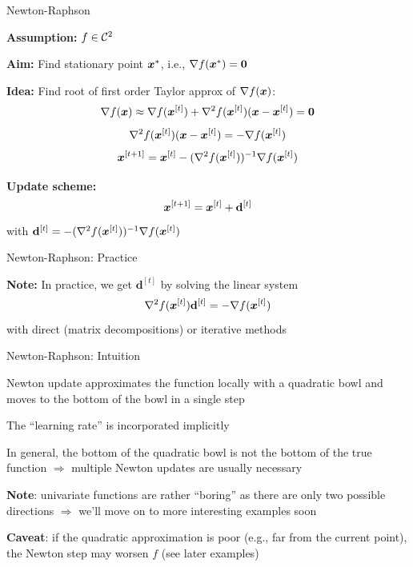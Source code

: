 \documentclass[11pt,compress,t,notes=noshow, xcolor=table]{beamer}
\begin{document}

\begin{framei}{Newton-Raphson}
\item \textbf{Assumption:} $f \in \mathcal{C}^{2}$
\item \textbf{Aim:} Find stationary point $\bm{x}^\ast$, i.e., $\nabla f(\bm{x}^\ast) = \mathbf{0}$
\item \textbf{Idea:} Find root of first order Taylor approx of $\nabla f(\bm{x})$:
$$
\nabla f(\bm{x}) \approx \nabla f(\bm{x}^{[t]}) +
\nabla^2 f(\bm{x}^{[t]})(\bm{x} - \bm{x}^{[t]}) = \mathbf{0}
$$
$$
\nabla^2 f(\bm{x}^{[t]})(\bm{x} - \bm{x}^{[t]}) = - \nabla f(\bm{x}^{[t]})
$$
$$
\bm{x}^{[t+1]} = \bm{x}^{[t]} - (\nabla^2 f(\bm{x}^{[t]}))^{-1}\nabla f(\bm{x}^{[t]})
$$
\item \textbf{Update scheme:}
$$
\bm{x}^{[t+1]} = \bm{x}^{[t]} + \mathbf{d}^{[t]}
$$
with $\mathbf{d}^{[t]} = - (\nabla^2 f(\bm{x}^{[t]}))^{-1}\nabla f(\bm{x}^{[t]})$
\end{framei}


\begin{framei}{Newton-Raphson: Practice}
\item \textbf{Note:} In practice, we get $\mathbf{d}^{[t]}$ by solving the linear system
$$
\nabla^2 f(\bm{x}^{[t]})\mathbf{d}^{[t]} = - \nabla f(\bm{x}^{[t]})
$$
with direct (matrix decompositions) or iterative methods
\end{framei}


\begin{framei}{Newton-Raphson: Intuition}
\item Newton update approximates the function locally with a quadratic bowl and moves to the bottom
of the bowl in a single step
\item The ``learning rate'' is incorporated implicitly
\item In general, the bottom of the quadratic bowl is not the bottom of the true function $\Rightarrow$
multiple Newton updates are usually necessary
\item[] {\small \textbf{Note}: univariate functions are rather ``boring'' as there are only two possible directions $\Rightarrow$ we'll move on to more interesting examples soon}
\item \textbf{Caveat}: if the quadratic approximation is poor (e.g., far from the current point), the Newton step may worsen $f$ (see later examples)
\end{framei}
\end{document}
